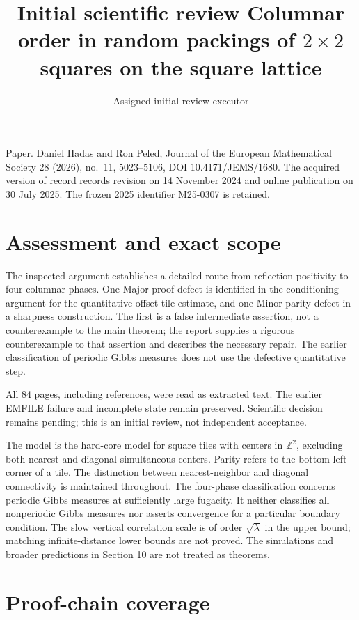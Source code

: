 \documentclass[10pt]{article}
\title{Initial scientific review
Columnar order in random packings of \(2\times2\) squares on the square lattice}
\author{Assigned initial-review executor}
\date{}
\begin{document}
\maketitle
Paper. Daniel Hadas and Ron Peled, Journal of the European Mathematical Society 28 (2026), no. 11, 5023–5106, DOI 10.4171/JEMS/1680. The acquired version of record records revision on 14 November 2024 and online publication on 30 July 2025. The frozen 2025 identifier M25-0307 is retained.\par
\section*{Assessment and exact scope}
The inspected argument establishes a detailed route from reflection positivity to four columnar phases. One Major proof defect is identified in the conditioning argument for the quantitative offset-tile estimate, and one Minor parity defect in a sharpness construction. The first is a false intermediate assertion, not a counterexample to the main theorem; the report supplies a rigorous counterexample to that assertion and describes the necessary repair. The earlier classification of periodic Gibbs measures does not use the defective quantitative step.\par
All 84 pages, including references, were read as extracted text. The earlier EMFILE failure and incomplete state remain preserved. Scientific decision remains pending; this is an initial review, not independent acceptance.\par
The model is the hard-core model for square tiles with centers in \(\mathbb Z^2\), excluding both nearest and diagonal simultaneous centers. Parity refers to the bottom-left corner of a tile. The distinction between nearest-neighbor and diagonal connectivity is maintained throughout. The four-phase classification concerns periodic Gibbs measures at sufficiently large fugacity. It neither classifies all nonperiodic Gibbs measures nor asserts convergence for a particular boundary condition. The slow vertical correlation scale is of order \(\sqrt\lambda\) in the upper bound; matching infinite-distance lower bounds are not proved. The simulations and broader predictions in Section 10 are not treated as theorems.\par
\section*{Proof-chain coverage}
\end{document}

